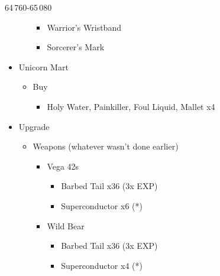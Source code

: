 \begin{paracol}{2}
\begin{shop}{64\,760-65\,080}
\begin{itemize}
\begin{itemize}
				            \begin{itemize}
					            \item Warrior's Wristband
					            \item Sorcerer's Mark
				            \end{itemize}
			      \end{itemize}
			\item Unicorn Mart
			      \begin{itemize}
				      \item Buy
				            \begin{itemize}
					            \item Holy Water, Painkiller, Foul Liquid, Mallet x4
				            \end{itemize}
			      \end{itemize}
		\end{itemize}
	\end{shop}

	\begin{upgrade}
		\begin{itemize}
			\item Upgrade
			      \begin{itemize}
				      \item Weapons (whatever wasn't done earlier)
				            \begin{itemize}
					            \item Vega 42s
					                  \begin{itemize}
						                  \item Barbed Tail x36 (3x EXP)
						                  \item Superconductor x6 (*)
					                  \end{itemize}
					            \item Wild Bear
					                  \begin{itemize}
						                  \item Barbed Tail x36 (3x EXP)
						                  \item Superconductor x4 (*)
					                  \end{itemize}


\end{itemize}
\end{itemize}
\end{itemize}
\end{upgrade}
\end{paracol}
